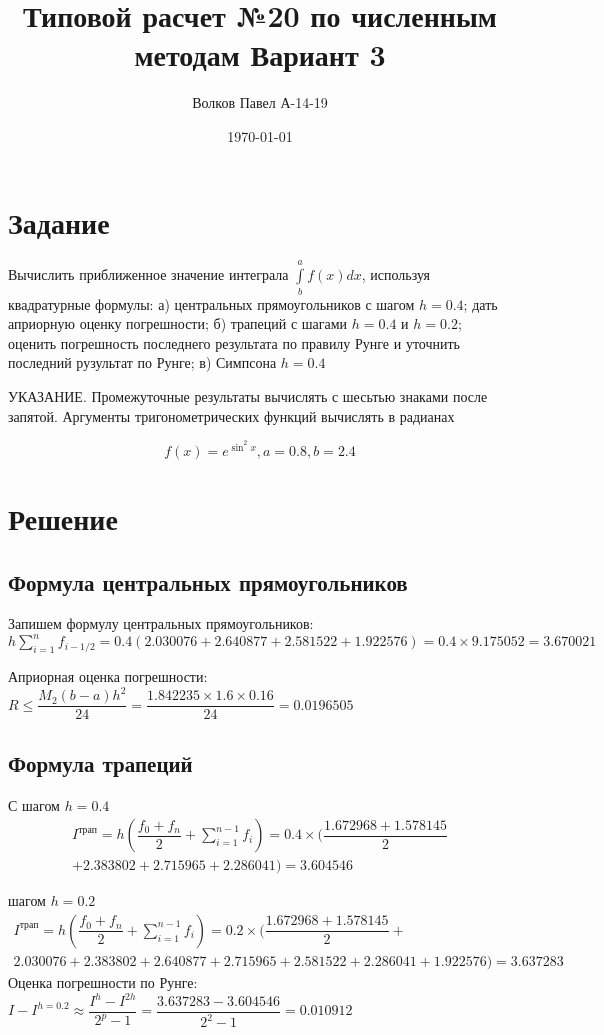 \documentclass[a4paper,12pt]{report} %
\author{Волков Павел А-14-19}
\title{Типовой расчет №20 по численным методам Вариант 3}
\date{\today}
\begin{document}

\maketitle

\newpage
\section*{Задание}
Вычислить приближенное значение интеграла $\int\limits^a_b f(x)dx$, используя квадратурные формулы: а) центральных прямоугольников с шагом $h = 0.4$; дать априорную оценку погрешности; б) трапеций с шагами $h = 0.4$ и $h = 0.2$; оценить погрешность последнего результата по правилу Рунге и уточнить последний рузультат по  Рунге; в) Симпсона $h = 0.4$

УКАЗАНИЕ. Промежуточные результаты вычислять с шесьтью знаками после запятой. Аргументы тригонометрических функций вычислять в радианах

\[
	f(x) = e^{\sin^2{x}}, a = 0.8, b = 2.4
\]

\section*{Решение}

\subsection*{Формула центральных прямоугольников}
Запишем формулу центральных прямоугольников: $h\sum\limits_{i=1}^{n}f_{i-1/2} = 0.4(2.030076 + 2.640877 + 2.581522 + 1.922576) = 0.4 \times 9.175052= 3.670021$

Априорная оценка погрешности: $R \leq \dfrac{M_2(b-a)h^2}{24} = \dfrac{1.842235 \times 1.6 \times 0.16}{24} = 0.0196505$

\subsection*{Формула трапеций}
С шагом $h = 0.4$
\begin{multline}
	I^{трап} = h(\dfrac{f_0 + f_n}{2} + \sum\limits_{i=1}^{n-1}f_i) = 
	0.4 \times (\dfrac{1.672968 + 1.578145}{2} \\
	+ 2.383802 + 2.715965 + 2.286041 ) = 3.604546
\end{multline}

 шагом $h = 0.2$
\begin{multline}
	I^{трап} = h(\dfrac{f_0 + f_n}{2} + \sum\limits_{i=1}^{n-1}f_i) = 0.2 \times (\dfrac{1.672968 + 1.578145}{2} +\\ 		2.030076 + 2.383802 +2.640877 + 2.715965 + 2.581522 + 2.286041 + 1.922576 ) = 3.637283
\end{multline}
Оценка погрешности по Рунге: $I - I^{h=0.2} \approx \dfrac{I^h - I^{2h}}{2^p - 1} = \dfrac{3.637283 - 3.604546}{2^2 -  1} = 0.010912$
\end{document}
